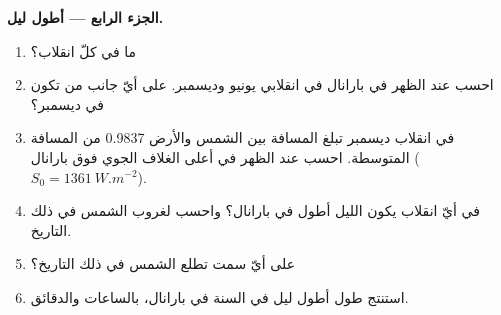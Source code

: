 \begin{problem}
\medskip
\noindent\textbf{الجزء الرابع --- أطول ليل.}
\begin{enumerate}[resume]
  \item ما  في كلّ انقلاب؟
  \item احسب  عند الظهر في بارانال في انقلابي يونيو وديسمبر. على أيّ جانب من  تكون في ديسمبر؟
  \item في انقلاب ديسمبر تبلغ المسافة بين الشمس والأرض 0.9837 من المسافة المتوسطة. احسب  عند الظهر في أعلى الغلاف الجوي فوق بارانال ($S_0 = \qty{1361}{W.m^{-2}}$).
  \item في أيّ انقلاب يكون الليل أطول في بارانال؟ واحسب  لغروب الشمس في ذلك التاريخ.
  \item على أيّ سمت تطلع الشمس في ذلك التاريخ؟
  \item استنتج طول أطول ليل في السنة في بارانال، بالساعات والدقائق.
\end{enumerate}
\end{problem}
